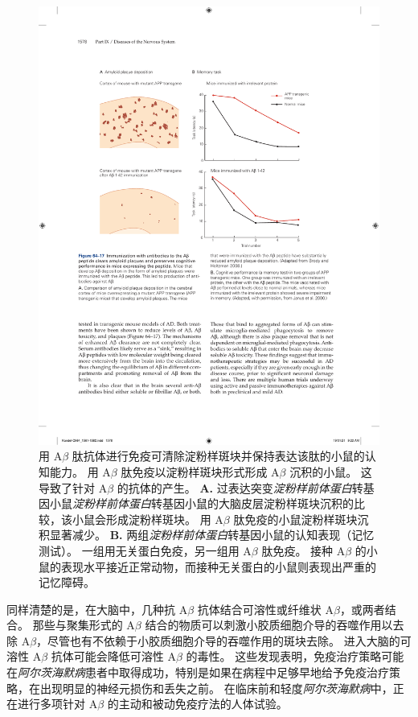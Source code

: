 \begin{figure}[htbp]
	\centering
	\includegraphics[width=1.0\linewidth]{chap64/fig_64_17}
	\caption{用 A$\beta$ 肽抗体进行免疫可清除淀粉样斑块并保持表达该肽的小鼠的认知能力。
		用 A$\beta$ 肽免疫以淀粉样斑块形式形成 A$\beta$ 沉积的小鼠。
		这导致了针对 A$\beta$ 的抗体的产生。
		\textbf{A.} 过表达突变\textit{淀粉样前体蛋白}转基因小鼠\textit{淀粉样前体蛋白}转基因小鼠的大脑皮层淀粉样斑块沉积的比较，该小鼠会形成淀粉样斑块。
		用 A$\beta$ 肽免疫的小鼠淀粉样斑块沉积显著减少\cite{brody2008active}。
		\textbf{B.} 两组\textit{淀粉样前体蛋白}转基因小鼠的认知表现（记忆测试）。
		一组用无关蛋白免疫，另一组用 A$\beta$ 肽免疫。
		接种 A$\beta$ 的小鼠的表现水平接近正常动物，而接种无关蛋白的小鼠则表现出严重的记忆障碍\cite{janus2000abeta}。}
	\label{fig:64_17}
\end{figure}


同样清楚的是，在大脑中，几种抗 A$\beta$ 抗体结合可溶性或纤维状 A$\beta$，或两者结合。
那些与聚集形式的 A$\beta$ 结合的物质可以刺激小胶质细胞介导的吞噬作用以去除 A$\beta$，尽管也有不依赖于小胶质细胞介导的吞噬作用的斑块去除。
进入大脑的可溶性 A$\beta$ 抗体可能会降低可溶性 A$\beta$ 的毒性。
这些发现表明，免疫治疗策略可能在\textit{阿尔茨海默病}患者中取得成功，特别是如果在病程中足够早地给予免疫治疗策略，在出现明显的神经元损伤和丢失之前。
在临床前和轻度\textit{阿尔茨海默病}中，正在进行多项针对 A$\beta$ 的主动和被动免疫疗法的人体试验。


